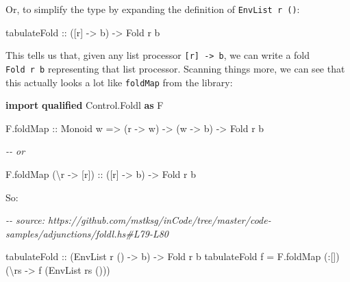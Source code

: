\documentclass[]{article}
\newenvironment{Shaded}{}{}
\newcommand{\CommentTok}[1]{\textcolor[rgb]{0.38,0.63,0.69}{\textit{#1}}}
\newcommand{\DataTypeTok}[1]{\textcolor[rgb]{0.56,0.13,0.00}{#1}}
\newcommand{\KeywordTok}[1]{\textcolor[rgb]{0.00,0.44,0.13}{\textbf{#1}}}
\newcommand{\NormalTok}[1]{#1}
\newcommand{\OperatorTok}[1]{\textcolor[rgb]{0.40,0.40,0.40}{#1}}
\newcommand{\OtherTok}[1]{\textcolor[rgb]{0.00,0.44,0.13}{#1}}
\begin{document}
Or, to simplify the type by expanding the definition of \texttt{EnvList\ r\ ()}:

\begin{Shaded}
\begin{Highlighting}[]
\OtherTok{tabulateFold ::}\NormalTok{ ([r] }\OtherTok{{-}\textgreater{}}\NormalTok{ b) }\OtherTok{{-}\textgreater{}} \DataTypeTok{Fold}\NormalTok{ r b}
\end{Highlighting}
\end{Shaded}

This tells us that, given any list processor
\texttt{{[}r{]}\ -\textgreater{}\ b}, we can write a fold \texttt{Fold\ r\ b}
representing that list processor. Scanning things more, we can see that this
actually looks a lot like \texttt{foldMap} from the library:

\begin{Shaded}
\begin{Highlighting}[]
\KeywordTok{import} \KeywordTok{qualified} \DataTypeTok{Control.Foldl} \KeywordTok{as} \DataTypeTok{F}

\NormalTok{F.foldMap}
\OtherTok{    ::} \DataTypeTok{Monoid}\NormalTok{ w}
    \OtherTok{=\textgreater{}}\NormalTok{ (r }\OtherTok{{-}\textgreater{}}\NormalTok{ w)}
    \OtherTok{{-}\textgreater{}}\NormalTok{ (w }\OtherTok{{-}\textgreater{}}\NormalTok{ b)}
    \OtherTok{{-}\textgreater{}} \DataTypeTok{Fold}\NormalTok{ r b}

\CommentTok{{-}{-} or}

\NormalTok{F.foldMap (\textbackslash{}r }\OtherTok{{-}\textgreater{}}\NormalTok{ [r])}
\OtherTok{    ::}\NormalTok{ ([r] }\OtherTok{{-}\textgreater{}}\NormalTok{ b)}
    \OtherTok{{-}\textgreater{}} \DataTypeTok{Fold}\NormalTok{ r b}
\end{Highlighting}
\end{Shaded}

So:

\begin{Shaded}
\begin{Highlighting}[]
\CommentTok{{-}{-} source: https://github.com/mstksg/inCode/tree/master/code{-}samples/adjunctions/foldl.hs\#L79{-}L80}

\OtherTok{tabulateFold ::}\NormalTok{ (}\DataTypeTok{EnvList}\NormalTok{ r () }\OtherTok{{-}\textgreater{}}\NormalTok{ b) }\OtherTok{{-}\textgreater{}} \DataTypeTok{Fold}\NormalTok{ r b}
\NormalTok{tabulateFold f }\OtherTok{=}\NormalTok{ F.foldMap (}\OperatorTok{:}\NormalTok{[]) (\textbackslash{}rs }\OtherTok{{-}\textgreater{}}\NormalTok{ f (}\DataTypeTok{EnvList}\NormalTok{ rs ()))}
\end{Highlighting}
\end{Shaded}
\end{document}
